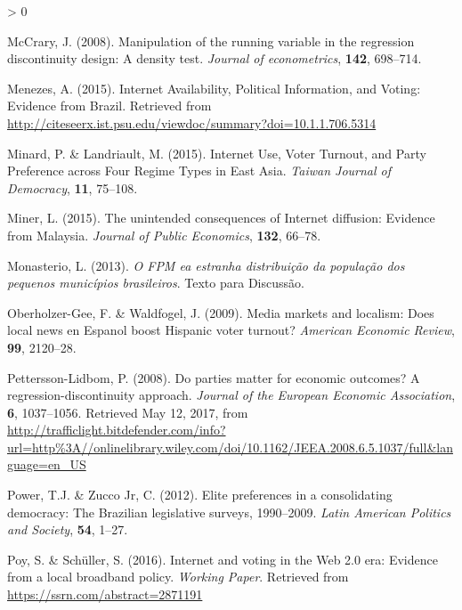 \documentclass[
  12pt,
]{article}
\newlength{\cslhangindent}
\newenvironment{CSLReferences}[2] %
 {%
  \setlength{\parindent}{0pt}
  \ifodd #1 \everypar{\setlength{\hangindent}{\cslhangindent}}\ignorespaces\fi
  \ifnum #2 > 0
  \setlength{\parskip}{#2\baselineskip}
  \fi
 }%
 {}
\begin{document}
\begin{CSLReferences}{1}{0}
\leavevmode\hypertarget{ref-mccrary_manipulation_2008}{}%
McCrary, J. (2008). Manipulation of the running variable in the
regression discontinuity design: {A} density test. \emph{Journal of
econometrics}, \textbf{142}, 698--714.

\leavevmode\hypertarget{ref-menezes_internet_2015}{}%
Menezes, A. (2015). Internet {Availability}, {Political} {Information},
and {Voting}: {Evidence} from {Brazil}. Retrieved from
\url{http://citeseerx.ist.psu.edu/viewdoc/summary?doi=10.1.1.706.5314}

\leavevmode\hypertarget{ref-minard_internet_2015}{}%
Minard, P. \& Landriault, M. (2015). Internet {Use}, {Voter} {Turnout},
and {Party} {Preference} across {Four} {Regime} {Types} in {East}
{Asia}. \emph{Taiwan Journal of Democracy}, \textbf{11}, 75--108.

\leavevmode\hypertarget{ref-miner_unintended_2015}{}%
Miner, L. (2015). The unintended consequences of {Internet} diffusion:
{Evidence} from {Malaysia}. \emph{Journal of Public Economics},
\textbf{132}, 66--78.

\leavevmode\hypertarget{ref-monasterio_o_2013}{}%
Monasterio, L. (2013). \emph{O {FPM} ea estranha distribuição da
população dos pequenos municípios brasileiros}. Texto para Discussão.

\leavevmode\hypertarget{ref-oberholzer-gee_media_2009}{}%
Oberholzer-Gee, F. \& Waldfogel, J. (2009). Media markets and localism:
{Does} local news en {Espanol} boost {Hispanic} voter turnout?
\emph{American Economic Review}, \textbf{99}, 2120--28.

\leavevmode\hypertarget{ref-pettersson-lidbom_parties_2008}{}%
Pettersson-Lidbom, P. (2008). Do parties matter for economic outcomes?
{A} regression-discontinuity approach. \emph{Journal of the European
Economic Association}, \textbf{6}, 1037--1056. Retrieved May 12, 2017,
from
\url{http://trafficlight.bitdefender.com/info?url=http\%3A//onlinelibrary.wiley.com/doi/10.1162/JEEA.2008.6.5.1037/full\&language=en_US}

\leavevmode\hypertarget{ref-power_elite_2012}{}%
Power, T.J. \& Zucco Jr, C. (2012). Elite preferences in a consolidating
democracy: The {Brazilian} legislative surveys, 1990--2009. \emph{Latin
American Politics and Society}, \textbf{54}, 1--27.

\leavevmode\hypertarget{ref-poy_internet_2016}{}%
Poy, S. \& Schüller, S. (2016). Internet and voting in the {Web} 2.0
era: Evidence from a local broadband policy. \emph{Working Paper}.
Retrieved from \url{https://ssrn.com/abstract=2871191}


\end{CSLReferences}
\end{document}
